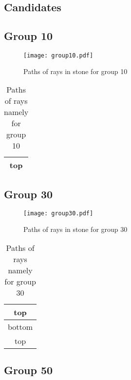 \subsection*{Candidates}
\subsection*{Group 10}






\begin{figure}[h!]
\centering
\texttt{[image: group10.pdf]}
\caption{Paths of rays in stone for group 10}
\label{table:FigGroup10}
\end{figure}



\begin{table}[h!]
\centering
\begin{tabular}{|c|}
\hline
top \\
\hline
\end{tabular}
\caption{Paths of rays namely for group 10}
\label{table:TableGroup10}
\end{table}
\newpage
\subsection*{Group 30}






\begin{figure}[h!]
\centering
\texttt{[image: group30.pdf]}
\caption{Paths of rays in stone for group 30}
\label{table:FigGroup30}
\end{figure}



\begin{table}[h!]
\centering
\begin{tabular}{|c|}
\hline
top \\
\hline
bottom \\
\hline
top \\
\hline
\end{tabular}
\caption{Paths of rays namely for group 30}
\label{table:TableGroup30}
\end{table}
\newpage
\subsection*{Group 50}






